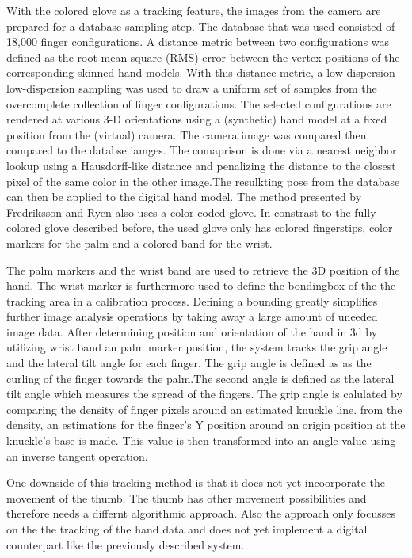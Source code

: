 With the colored glove as a tracking feature, the images from the camera are prepared for a database sampling step. The database that was used consisted of 18,000 finger configurations. 
A distance metric between two configurations was defined as the root mean square (RMS) error between the vertex positions of the corresponding skinned hand models. With this distance metric, a low dispersion low-dispersion sampling was used to draw a uniform set of samples from the overcomplete collection of finger configurations.
The selected configurations are rendered at various 3-D orientations using a (synthetic) hand model at a fixed position from the (virtual) camera.
The camera image was compared then compared to the databse iamges. The comaprison is done via a nearest neighbor lookup using a Hausdorff-like distance \cite{Huttenlocher.1993} and penalizing the distance to the closest pixel of the same color in the other image.The resulkting pose from the database can then be applied to the digital hand model.
The method presented by Fredriksson and Ryen \cite{Fredriksson.2008} also uses a color coded glove. In constrast to the fully colored glove described before, the used glove only has colored fingerstips, color markers for the palm and a colored band for the wrist.

The palm markers and the wrist band are used to retrieve the 3D position of the hand. The wrist marker is furthermore used to define the bondingbox of the the tracking area in a calibration process. Defining a bounding greatly simplifies further image analysis operations by taking away a large amount of uneeded image data.
After determining position and orientation of the hand in 3d by utilizing wrist band an palm marker position, the system tracks the grip angle and the lateral tilt angle for each finger. The grip angle is defined as as the curling of the finger towards the palm.The second angle is defined as the lateral tilt angle which measures the spread of the fingers.
The grip angle is calulated by comparing the density of finger pixels around an estimated knuckle line. from the density, an estimations for
the finger’s Y position around an origin position at the knuckle’s base is made. This value is then transformed into an angle value using an inverse tangent operation.

One downside of this tracking method is that it does not yet incoorporate the movement of the thumb. The thumb has other movement possibilities and therefore needs a differnt algorithmic approach. Also the approach only focusses on the the tracking of the hand data and does not yet implement a digital counterpart like the previously described system.

